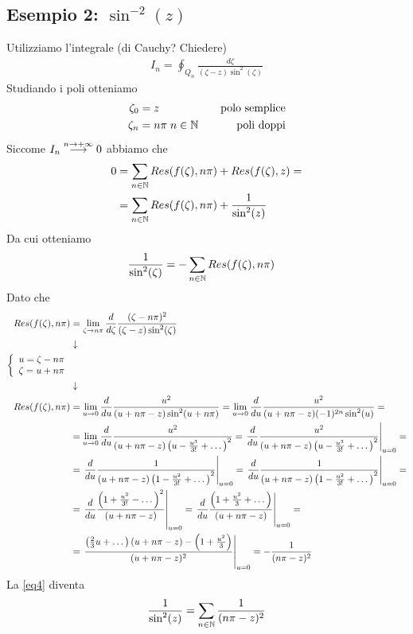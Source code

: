 \newpage

\subsection{Esempio 2: $\sin^{-2}(z)$}

Utilizziamo l'integrale (di Cauchy? Chiedere)
\begin{align}
	I_n = \oint_{Q_n} \frac{d\zeta}{(\zeta -z) \sin^2(\zeta)}
\end{align}
Studiando i poli otteniamo
\begin{align}
	\zeta_0 &= z \quad &\text{polo semplice}\\
	\zeta_n &= n\pi \; n\in \mathbb{N}  \quad &\text{poli doppi}
\end{align}
Siccome $I_n \overset{n \rightarrow +\infty}{\longrightarrow} 0$ abbiamo che
\begin{align}
	0 &= \sum_{n\in \mathbb{N}} Res(f(\zeta), n\pi) + Res(f(\zeta), z) =\nonumber\\
	  &= \sum_{n\in \mathbb{N}} Res(f(\zeta), n\pi) + \frac{1}{\sin^2(z)}  \label{eq4}
\end{align}
Da cui otteniamo
\begin{align}
	  \frac{1}{\sin^2(\zeta)} &= -\sum_{n\in \mathbb{N}} Res(f(\zeta), n\pi)
\end{align}
Dato che
\begin{align}
	Res(f(\zeta), n\pi) &= \underset{\zeta \rightarrow n\pi}{\lim} \, \frac{d}{d\zeta} \frac{(\zeta - n\pi)^2}{(\zeta - z) \sin^2(\zeta)} \\ &\downarrow \nonumber \\
	\left\{ \begin{array}{cc} u=\zeta - n\pi\\ \zeta = u + n\pi \end{array} \right. \nonumber \\ &\downarrow \nonumber \\
	Res(f(\zeta), n\pi) &= \underset{u \rightarrow 0}{\lim} \, \frac{d}{du} \frac{u^2}{(u + n\pi - z) \sin^2(u + n\pi)} =  \underset{u \rightarrow 0}{\lim} \, \frac{d}{du} \frac{u^2}{(u + n\pi - z) (-1)^{2n} \sin^2(u)}= \nonumber\\
	&= \underset{u \rightarrow 0}{\lim} \, \frac{d}{du} \frac{u^2}{(u + n\pi - z) \left(u -\frac{u^3}{3!} + \dots\right)^2} = \left. \frac{d}{du} \frac{u^2}{(u + n\pi - z) \left(u -\frac{u^3}{3!} + \dots\right)^2} \right|_{u=0} = \nonumber \\
	&= \left. \frac{d}{du} \frac{1}{(u + n\pi - z) \left(1 -\frac{u^2}{3!} + \dots\right)^2} \right|_{u=0} = \left. \frac{d}{du} \frac{1}{(u + n\pi - z) \left(1 -\frac{u^2}{3!} + \dots\right)^2} \right|_{u=0} = \nonumber \\
	&= \left. \frac{d}{du} \frac{\left(1 +\frac{u^2}{3!} - \dots\right)^2}{(u + n\pi - z) } \right|_{u=0} = \left. \frac{d}{du} \frac{\left(1 +\frac{u^2}{3} + \dots\right)}{(u + n\pi - z) } \right|_{u=0} = \nonumber \\
	&= \left. \frac{\left( \frac{2}{3} u + \dots \right) (u + n\pi-z ) - \left(1 + \frac{u^2}{3}\right)}{(u+ n\pi -z)^2} \right|_{u=0} = -\frac{1}{(n\pi -z)^2}
\end{align}
La \ref{eq4} diventa
\begin{align}
	\frac{1}{\sin^2(z)} = \sum_{n\in \mathbb{N}} \frac{1}{(n\pi -z)^2}
\end{align}

